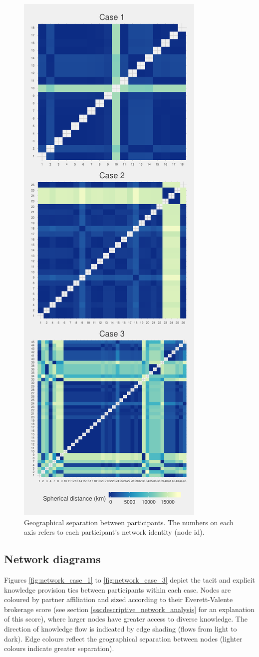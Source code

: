 \begin{figure}[h!]
\centering
\includegraphics[width = 0.5\linewidth]{Images/proximity.pdf}
\caption[Geographical separation between participants]{Geographical separation between participants. The numbers on each axis refers to each participant's network identity (node id).}
\label{fig:spherical}
\end{figure}

\subsection{Network diagrams}

Figures \ref{fig:network_case_1} to \ref{fig:network_case_3} depict the tacit and explicit knowledge provision ties between participants within each case. Nodes are coloured by partner affiliation and sized according to their Everett-Valente brokerage score (see section \ref{sss:descriptive_network_analysis} for an explanation of this score), where larger nodes have greater access to diverse knowledge. The direction of knowledge flow is indicated by edge shading (flows from light to dark). Edge colours reflect the geographical separation between nodes (lighter colours indicate greater separation). \medskip

